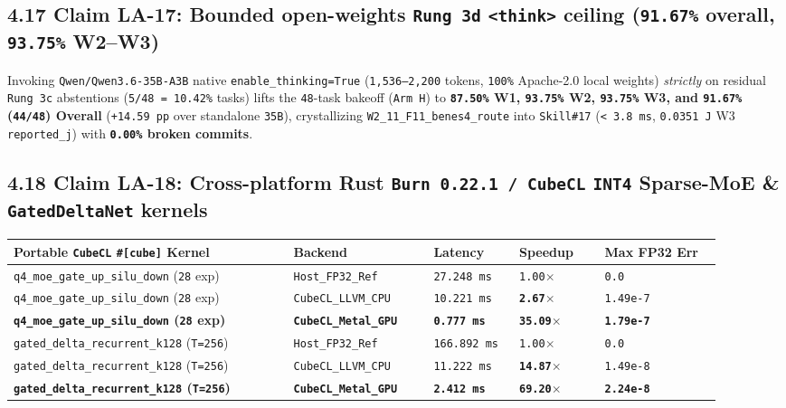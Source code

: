 \documentclass[10pt]{article}
\begin{document}
\subsection{4.17 Claim LA-17: Bounded open-weights \texttt{Rung 3d} \texttt{<think>} ceiling (\texttt{91.67\%} overall, \texttt{93.75\%} W2--W3)}\label{claim-la17}

Invoking \texttt{Qwen/Qwen3.6-35B-A3B} native \texttt{enable\_thinking=True} (\texttt{1,536--2,200} tokens, \texttt{100\%} Apache-2.0 local weights) \emph{strictly} on residual \texttt{Rung 3c} abstentions (\texttt{5/48 = 10.42\%} tasks) lifts the \texttt{48}-task bakeoff (\texttt{Arm H}) to \textbf{\texttt{87.50\%} W1, \texttt{93.75\%} W2, \texttt{93.75\%} W3, and \texttt{91.67\%} (\texttt{44/48}) Overall} (\texttt{+14.59 pp} over standalone \texttt{35B}), crystallizing \texttt{W2\_11\_F11\_benes4\_route} into \texttt{Skill\#17} (\texttt{< 3.8 ms}, \texttt{0.0351 J} W3 \texttt{reported\_j}) with \textbf{\texttt{0.00\%} broken commits}.

\subsection{4.18 Claim LA-18: Cross-platform Rust \texttt{Burn 0.22.1 / CubeCL} \texttt{INT4} Sparse-MoE \& \texttt{GatedDeltaNet} kernels}\label{claim-la18}

{\footnotesize\setlength{\tabcolsep}{3pt}
\begin{longtable}{@{}L{0.36\linewidth}C{0.18\linewidth}C{0.11\linewidth}C{0.11\linewidth}C{0.15\linewidth}@{}}
\toprule
\textbf{Portable \texttt{CubeCL} \texttt{\#[cube]} Kernel} & \textbf{Backend} & \textbf{Latency} & \textbf{Speedup} & \textbf{Max FP32 Err} \\
\midrule
\endhead
\texttt{q4\_moe\_gate\_up\_silu\_down} (\texttt{28} exp) & \texttt{Host\_FP32\_Ref} & \texttt{27.248 ms} & \texttt{1.00$\times$} & \texttt{0.0} \\
\texttt{q4\_moe\_gate\_up\_silu\_down} (\texttt{28} exp) & \texttt{CubeCL\_LLVM\_CPU} & \texttt{10.221 ms} & \textbf{\texttt{2.67$\times$}} & \texttt{1.49e-7} \\
\textbf{\texttt{q4\_moe\_gate\_up\_silu\_down} (\texttt{28} exp)} & \textbf{\texttt{CubeCL\_Metal\_GPU}} & \textbf{\texttt{0.777 ms}} & \textbf{\texttt{35.09$\times$}} & \textbf{\texttt{1.79e-7}} \\
\midrule
\texttt{gated\_delta\_recurrent\_k128} (\texttt{T=256}) & \texttt{Host\_FP32\_Ref} & \texttt{166.892 ms} & \texttt{1.00$\times$} & \texttt{0.0} \\
\texttt{gated\_delta\_recurrent\_k128} (\texttt{T=256}) & \texttt{CubeCL\_LLVM\_CPU} & \texttt{11.222 ms} & \textbf{\texttt{14.87$\times$}} & \texttt{1.49e-8} \\
\textbf{\texttt{gated\_delta\_recurrent\_k128} (\texttt{T=256})} & \textbf{\texttt{CubeCL\_Metal\_GPU}} & \textbf{\texttt{2.412 ms}} & \textbf{\texttt{69.20$\times$}} & \textbf{\texttt{2.24e-8}} \\
\bottomrule
\end{longtable}
}
\end{document}
